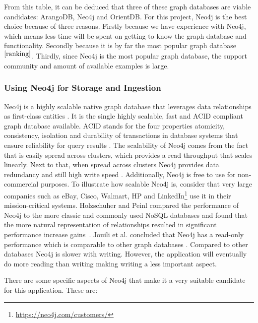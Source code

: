 From this table, it can be deduced that three of these graph databases are viable candidates: ArangoDB, Neo4j and OrientDB. For this project, Neo4j is the best choice because of three reasons. Firstly because we have experience with Neo4j, which means less time will be spent on getting to know the graph database and functionality. Secondly because it is by far the most popular graph database $^{\ref{ranking}}$. Thirdly, since Neo4j is the most popular graph database, the support community and amount of available examples is large.

\subsubsection{Using Neo4j for Storage and Ingestion}
Neo4j is a highly scalable native graph database that leverages data relationships as first-class entities \cite{neo4j}. It is the single highly scalable, fast and ACID compliant graph database available. ACID stands for the four properties atomicity, consistency, isolation and durability of transactions in database systems that ensure reliability for query results \cite{haerder1983principles}. The scalability of Neo4j comes from the fact that is easily spread across clusters, which provides a read throughput that scales linearly. Next to that, when spread across clusters Neo4j provides data redundancy and still high write speed \cite{neo4jscalable}. Additionally, Neo4j is free to use for non-commercial purposes. To illustrate how scalable Neo4j is, consider that very large companies such as eBay, Cisco, Walmart, HP and LinkedIn\footnote{\url{https://neo4j.com/customers/}} use it in their mission-critical systems. Holzschuher and Peinl compared the performance of Neo4j to the more classic and commonly used NoSQL databases and found that the more natural representation of relationships resulted in significant performance increase gains~\cite{holzschuher2013performance}. Jouili et al. concluded that Neo4j has a read-only performance which is comparable to other graph databases \cite{jouili2013}. Compared to other databases Neo4j is slower with writing. However, the application will eventually do more reading than writing making writing a less important aspect.

There are some specific aspects of Neo4j that make it a very suitable candidate for this application. These are:

